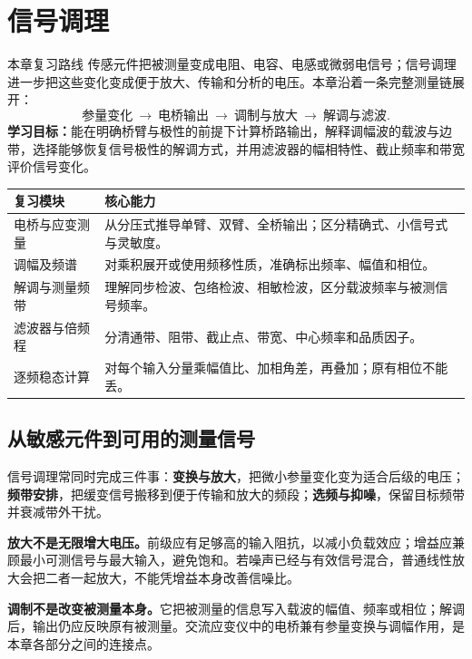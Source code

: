 \chapter{信号调理}
\label{chap:signal-conditioning}

\begin{focusbox}{本章复习路线}
传感元件把被测量变成电阻、电容、电感或微弱电信号；信号调理进一步把这些变化变成便于放大、传输和分析的电压。本章沿着一条完整测量链展开：
\[
\text{参量变化}\ \longrightarrow\ \text{电桥输出}\ \longrightarrow\
\text{调制与放大}\ \longrightarrow\ \text{解调与滤波}.
\]
\textbf{学习目标：}能在明确桥臂与极性的前提下计算桥路输出，解释调幅波的载波与边带，选择能够恢复信号极性的解调方式，并用滤波器的幅相特性、截止频率和带宽评价信号变化。
\end{focusbox}

\begin{table}[H]
\centering\small
\begin{tabularx}{\linewidth}{@{}p{2.8cm} X@{}}
\toprule
复习模块 & 核心能力 \\
\midrule
电桥与应变测量 & 从分压式推导单臂、双臂、全桥输出；区分精确式、小信号式与灵敏度。 \\
调幅及频谱 & 对乘积展开或使用频移性质，准确标出频率、幅值和相位。 \\
解调与测量频带 & 理解同步检波、包络检波、相敏检波，区分载波频率与被测信号频率。 \\
滤波器与倍频程 & 分清通带、阻带、截止点、带宽、中心频率和品质因子。 \\
逐频稳态计算 & 对每个输入分量乘幅值比、加相角差，再叠加；原有相位不能丢。 \\
\bottomrule
\end{tabularx}
\end{table}

\section{从敏感元件到可用的测量信号}

信号调理常同时完成三件事：\textbf{变换与放大}，把微小参量变化变为适合后级的电压；\textbf{频带安排}，把缓变信号搬移到便于传输和放大的频段；\textbf{选频与抑噪}，保留目标频带并衰减带外干扰。

\textbf{放大不是无限增大电压。}前级应有足够高的输入阻抗，以减小负载效应；增益应兼顾最小可测信号与最大输入，避免饱和。若噪声已经与有效信号混合，普通线性放大会把二者一起放大，不能凭增益本身改善信噪比。

\textbf{调制不是改变被测量本身。}它把被测量的信息写入载波的幅值、频率或相位；解调后，输出仍应反映原有被测量。交流应变仪中的电桥兼有参量变换与调幅作用，是本章各部分之间的连接点。

